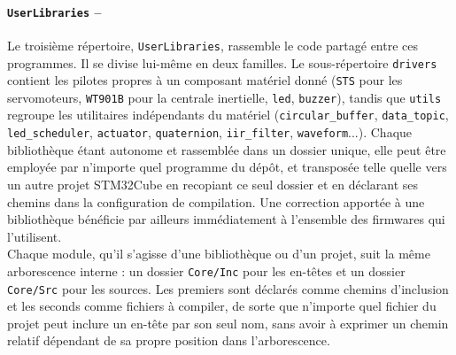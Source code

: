 \begin{minipage}{0.5\textwidth}
    \paragraph*{\textbf{\texttt{UserLibraries} --}} Le troisième répertoire, \texttt{UserLibraries}, rassemble le code partagé
    entre ces programmes. Il se divise lui-même en deux familles. Le sous-répertoire \texttt{drivers} contient les pilotes
    propres à un composant matériel donné (\texttt{STS} pour les servomoteurs, \texttt{WT901B} pour la centrale inertielle,
    \texttt{led}, \texttt{buzzer}), tandis que \texttt{utils} regroupe les utilitaires indépendants du matériel
    (\texttt{circular\_buffer}, \texttt{data\_topic}, \texttt{led\_scheduler}, \texttt{actuator}, \texttt{quaternion},
    \texttt{iir\_filter}, \texttt{waveform}...). Chaque bibliothèque étant autonome et rassemblée dans un dossier unique, elle
    peut être employée par n'importe quel programme du dépôt, et transposée telle quelle vers un autre projet STM32Cube en
    recopiant ce seul dossier et en déclarant ses chemins dans la configuration de compilation. Une correction apportée à une
    bibliothèque bénéficie par ailleurs immédiatement à l'ensemble des firmwares qui l'utilisent.\\

    Chaque module, qu'il s'agisse d'une bibliothèque ou d'un projet, suit la même arborescence interne : un dossier
    \texttt{Core/Inc} pour les en-têtes et un dossier \texttt{Core/Src} pour les sources. Les premiers sont déclarés comme
    chemins d'inclusion et les seconds comme fichiers à compiler, de sorte que n'importe quel fichier du projet peut inclure un
    en-tête par son seul nom, sans avoir à exprimer un chemin relatif dépendant de sa propre position dans l'arborescence.
\end{minipage}
\hfill
